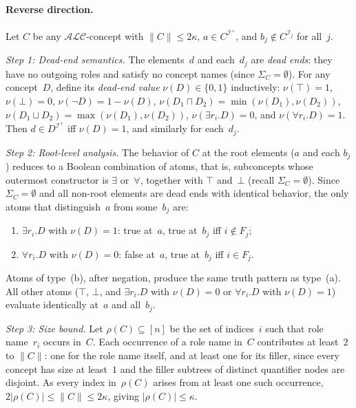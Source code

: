 \documentclass[accepted]{uai2026} %
\theoremstyle{definition}
\theoremstyle{remark}
\begin{document}
\paragraph{Reverse direction.}
Let $C$ be any $\mathcal{ALC}$-concept with $\|C\| \leq 2\kappa$,
$a \in C^{\mathcal{I}^+}$, and
$b_j \notin C^{\mathcal{I}_j}$ for all~$j$.

\emph{Step 1: Dead-end semantics.}
The elements~$d$ and each~$d_j$ are \emph{dead ends}: they have no
outgoing roles and satisfy no concept names (since
$\Sigma_C = \emptyset$). For any concept~$D$, define its
\emph{dead-end value} $\nu(D) \in \{0,1\}$ inductively:
$\nu(\top) = 1$, $\nu(\bot) = 0$,
$\nu(\neg D) = 1 - \nu(D)$,
$\nu(D_1 \sqcap D_2) = \min(\nu(D_1), \nu(D_2))$,
$\nu(D_1 \sqcup D_2) = \max(\nu(D_1), \nu(D_2))$,
$\nu(\exists r_i.D) = 0$, and
$\nu(\forall r_i.D) = 1$.
Then $d \in D^{\mathcal{I}^+}$ iff $\nu(D) = 1$, and similarly
for each~$d_j$.

\emph{Step 2: Root-level analysis.}
The behavior of $C$ at the root elements ($a$ and each $b_j$)
reduces to a Boolean combination of atoms, that
is, subconcepts
whose outermost constructor is $\exists$ or~$\forall$, together
with $\top$ and~$\bot$ (recall $\Sigma_C = \emptyset$). Since
$\Sigma_C = \emptyset$ and all non-root elements are dead ends
with identical behavior, the only atoms that distinguish~$a$
from some~$b_j$ are:
\begin{enumerate}[label=(\alph*)]
  \item $\exists r_i.D$ with $\nu(D) = 1$:
    true at~$a$, true at~$b_j$ iff $i \notin F_j$;
  \item $\forall r_i.D$ with $\nu(D) = 0$:
    false at~$a$, true at~$b_j$ iff $i \in F_j$.
\end{enumerate}
Atoms of type~(b), after negation, produce the same truth pattern
as type~(a). All other atoms ($\top$, $\bot$, and
$\exists r_i.D$ with $\nu(D)=0$ or $\forall r_i.D$ with
$\nu(D)=1$) evaluate identically at~$a$ and all~$b_j$.

\emph{Step 3: Size bound.}
Let $\rho(C) \subseteq [n]$ be the set of
indices~$i$ such that role name~$r_i$ occurs in~$C$. Each
occurrence of a role name in~$C$ contributes at least~$2$ to
$\|C\|$: one for the role name itself, and at least one for its
filler, since every concept has size at least~$1$ and the filler
subtrees of distinct quantifier nodes are disjoint. As every
index in~$\rho(C)$ arises from at least one such occurrence,
$2|\rho(C)| \leq \|C\| \leq 2\kappa$, giving
$|\rho(C)| \leq \kappa$.
\end{document}
